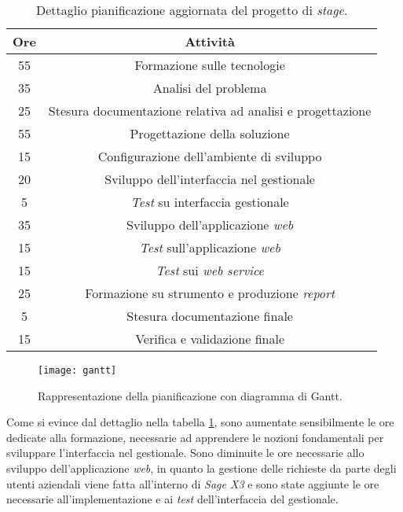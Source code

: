 \begin{center}
	\begin{longtable}{ | c| c|} 		
		\caption{Dettaglio pianificazione aggiornata del progetto di \textit{stage}.}
		\label{table:requisiti-aggiornati}\\
		\hline
		\textbf{Ore} & \textbf{Attività}\\
		\hline
		55 & Formazione sulle tecnologie\\
		\hline
		35 & Analisi del problema\\
		\hline
		25 & Stesura documentazione relativa ad analisi e progettazione\\
		\hline
		55 & Progettazione della soluzione\\
		\hline
		15 & Configurazione dell'ambiente di sviluppo\\
		\hline
		20 & Sviluppo dell'interfaccia nel gestionale\\
		\hline
		5 & \textit{Test} su interfaccia gestionale\\
		\hline
		35 & Sviluppo dell'applicazione \textit{web}\\
		\hline
		15 & \textit{Test} sull'applicazione \textit{web}\\
		\hline
		15 & \textit{Test }sui \textit{web service}\\
		\hline
		25 & Formazione su strumento e produzione \textit{report}\\
		\hline
		5 & Stesura documentazione finale\\
		\hline
		15 & Verifica e validazione finale\\
		\hline
	\end{longtable}
\end{center}

\begin{figure}[htbp]
	\begin{center}
		\texttt{[image: gantt]}
		\caption{Rappresentazione della pianificazione con diagramma di Gantt.}
	\end{center}
\end{figure}

\newpage

Come si evince dal dettaglio nella tabella \ref{table:requisiti-aggiornati}, sono aumentate sensibilmente le ore dedicate alla formazione, necessarie ad apprendere le nozioni fondamentali per sviluppare l'interfaccia nel gestionale. Sono diminuite le ore necessarie allo sviluppo dell'applicazione \textit{web}, in quanto la gestione delle richieste da parte degli utenti aziendali viene fatta all'interno di \textit{Sage X3} e sono state aggiunte le ore necessarie all'implementazione e ai \textit{test} dell'interfaccia del gestionale.


